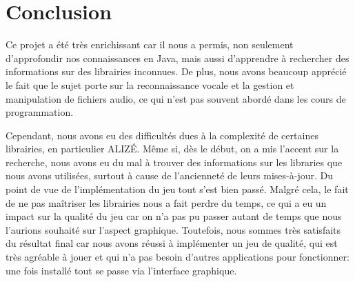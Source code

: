 \section{Conclusion}
\label{sec:conclusion}

Ce projet a été très enrichissant car il nous a permis, non seulement d'approfondir nos connaissances en Java, mais aussi d'apprendre à rechercher des
informations sur des librairies inconnues. De plus, nous avons beaucoup apprécié le fait que le sujet porte sur la reconnaissance vocale et la gestion et
manipulation de fichiers audio, ce qui n'est pas souvent abordé dans les cours de programmation.

Cependant, nous avons eu des difficultés dues à la complexité de certaines librairies, en particulier ALIZÉ. Même si, dès le début, on a mis l'accent sur la
recherche, nous avons eu du mal à trouver des informations sur les libraries que nous avons utilisées, surtout à cause de l'ancienneté de leurs mises-à-jour.
Du point de vue de l'implémentation du jeu tout s'est bien passé. Malgré cela, le fait de ne pas maîtriser les librairies nous a fait perdre du temps, ce qui
a eu un impact sur la qualité du jeu car on n'a pas pu passer autant de temps que nous l'aurions souhaité sur l'aspect graphique. Toutefois, nous sommes
très satisfaits du résultat final car nous avons réussi à implémenter un jeu de qualité, qui est très agréable à jouer et qui n'a pas besoin d'autres
applications pour fonctionner: une fois installé tout se passe via l'interface graphique.

